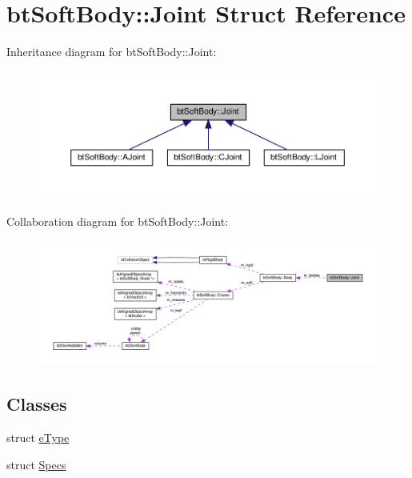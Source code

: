 \hypertarget{structbtSoftBody_1_1Joint}{}\section{bt\+Soft\+Body\+:\+:Joint Struct Reference}
\label{structbtSoftBody_1_1Joint}


Inheritance diagram for bt\+Soft\+Body\+:\+:Joint\+:
\nopagebreak
\begin{figure}[H]
\begin{center}
\leavevmode
\includegraphics[width=350pt]{structbtSoftBody_1_1Joint__inherit__graph}
\end{center}
\end{figure}


Collaboration diagram for bt\+Soft\+Body\+:\+:Joint\+:
\nopagebreak
\begin{figure}[H]
\begin{center}
\leavevmode
\includegraphics[width=350pt]{structbtSoftBody_1_1Joint__coll__graph}
\end{center}
\end{figure}
\subsection*{Classes}
\begin{DoxyCompactItemize}
\item 
struct \hyperlink{structbtSoftBody_1_1Joint_1_1eType}{e\+Type}
\item 
struct \hyperlink{structbtSoftBody_1_1Joint_1_1Specs}{Specs}
\end{DoxyCompactItemize}
